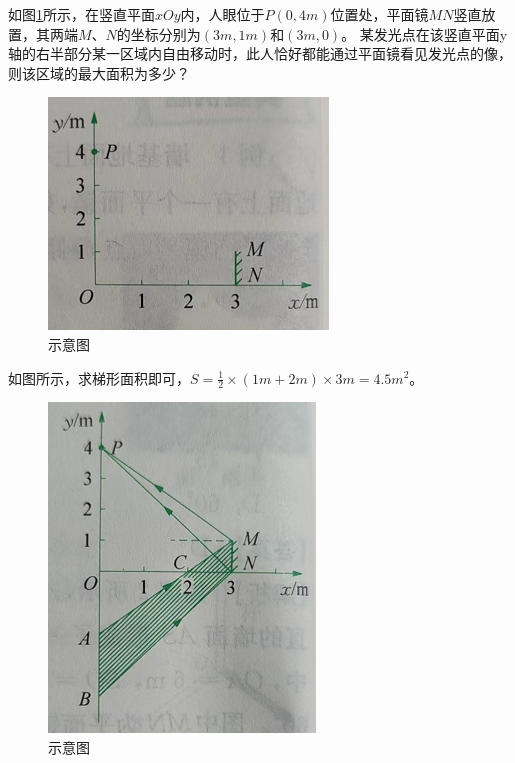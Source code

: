 \documentclass[windows,csize4]{BHCexam}
\begin{document}
\begin{groups}
\begin{questions}[]
        \question[5]如图\ref{fig:fig_3_13}所示，在竖直平面$xOy$内，人眼位于$P(0,4m)$位置处，平面镜$MN$竖直放置，其两端$M$、$N$的坐标分别为$(3m,1m)$和$(3m,0)$。
        某发光点在该竖直平面y轴的右半部分某一区域内自由移动时，此人恰好都能通过平面镜看见发光点的像，则该区域的最大面积为多少？
        \begin{figure}[htb]
            \centering
            \includegraphics [scale=0.5,trim=0 0 0 0]{./image/fig_3_13.PNG}
            \caption{示意图}
            \label{fig:fig_3_13}
        \end{figure}
        \begin{solution}{0.5cm}
            \methodonly  如图所示，求梯形面积即可，$S=\frac{1}{2}\times (1m+2m)\times 3m=4.5m^2$。
            \begin{figure}[htb]
                \centering
                \includegraphics [scale=0.5,trim=0 0 0 0]{./image/fig_3_14.PNG}
                \caption{示意图}
                \label{fig:fig_3_14}
            \end{figure}
        \end{solution}
        \vspace{3cm}

\end{questions}
\end{groups}
\end{document}
